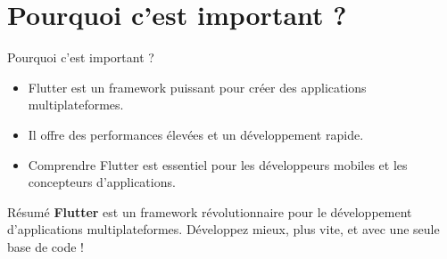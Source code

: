 \documentclass{clbeamer2024}
\begin{document}
 \section{Pourquoi c'est important ?}
 \begin{frame}{Pourquoi c'est important ?}
 	\begin{itemize}
 		\item Flutter est un framework puissant pour créer des applications multiplateformes.
 		\item Il offre des performances élevées et un développement rapide.
 		\item Comprendre Flutter est essentiel pour les développeurs mobiles et les concepteurs d'applications.
 	\end{itemize}
 \end{frame}
 
 \begin{frame}{Résumé}
 	\textbf{Flutter} est un framework révolutionnaire pour le développement d'applications multiplateformes.  
 	Développez mieux, plus vite, et avec une seule base de code !  \end{frame}



	
	
\end{document}
